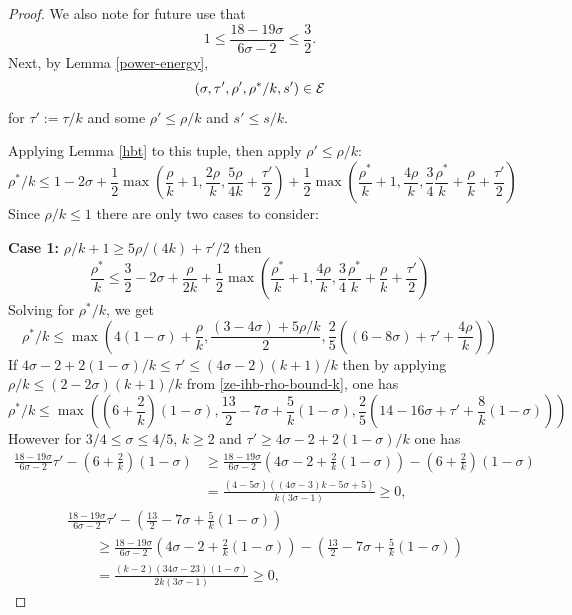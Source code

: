 \begin{proof}
We also note for future use that
\begin{equation}\label{ze-ihb-bound-tau-factor}
1 \le \frac{18 - 19\sigma}{6\sigma - 2} \le \frac{3}{2}.
\end{equation}
Next, by Lemma \ref{power-energy},
\[
(\sigma, \tau', \rho', \rho^*/k, s') \in \mathcal{E}
\]
for $\tau' := \tau/k$ and some $\rho' \le \rho/k$ and $s' \le s/k$.

Applying Lemma \ref{hbt} to this tuple, then apply $\rho' \le \rho/k$:
\[
\rho^*/k \leq 1-2\sigma + \frac{1}{2}\max(\frac{\rho}{k}+1, \frac{2\rho}{k}, \frac{5\rho}{4k} + \frac{\tau'}{2}) + \frac{1}{2}\max(\frac{\rho^*}{k}+1, \frac{4\rho}{k}, \frac{3}{4}\frac{\rho^*}{k} +\frac{\rho}{k}+\frac{\tau'}{2})
\]
Since $\rho/k \le 1$ there are only two cases to consider:

\textbf{Case 1:} $\rho/k + 1 \ge 5\rho/(4k) + \tau'/2$ then
\[
\frac{\rho^*}{k} \le \frac{3}{2} - 2\sigma + \frac{\rho}{2k} + \frac{1}{2}\max(\frac{\rho^*}{k}+1, \frac{4\rho}{k}, \frac{3}{4}\frac{\rho^*}{k} +\frac{\rho}{k}+\frac{\tau'}{2})
\]
Solving for $\rho^*/k$, we get
\[
\rho^*/k \le \max(4(1 - \sigma) + \frac{\rho}{k}, \frac{(3 - 4\sigma) + 5\rho/k}{2}, \frac{2}{5}((6 - 8\sigma) + \tau' + \frac{4\rho}{k}))
\]
If $4\sigma - 2 + 2(1 - \sigma)/k \le \tau' \le (4\sigma - 2)(k + 1)/k$ then by applying $\rho/k \le (2 - 2\sigma)(k + 1)/k$ from \eqref{ze-ihb-rho-bound-k}, one has
\[
\rho^*/k \le \max((6 + \frac{2}{k})(1 - \sigma), \frac{13}{2} - 7\sigma + \frac{5}{k} (1 - \sigma), \frac{2}{5}(14 - 16\sigma + \tau' + \frac{8}{k}(1 - \sigma)))
\]
However for $3/4 \le \sigma \le 4/5$, $k \ge 2$ and $\tau' \ge 4\sigma - 2 + 2(1 - \sigma)/k$ one has
\begin{align*}
\frac{18 - 19\sigma}{6\sigma - 2}\tau' - (6 + \frac{2}{k})(1 - \sigma) &\ge \frac{18 - 19\sigma}{6\sigma - 2}(4\sigma - 2 + \frac{2}{k}(1 - \sigma)) - (6 + \frac{2}{k})(1 - \sigma) \\
&= \frac{(4 - 5\sigma) ((4\sigma - 3)k - 5\sigma + 5)}{k(3\sigma - 1)} \ge 0,
\end{align*}
\begin{align*}
&\frac{18 - 19\sigma}{6\sigma - 2}\tau' - \left(\frac{13}{2} - 7\sigma + \frac{5}{k} (1 - \sigma)\right) \\
&\qquad\ge \frac{18 - 19\sigma}{6\sigma - 2}(4\sigma - 2 + \frac{2}{k}(1 - \sigma)) - \left(\frac{13}{2} - 7\sigma + \frac{5}{k} (1 - \sigma)\right) \\
&\qquad= \frac{(k - 2) (34\sigma - 23) (1 - \sigma)}{2 k (3\sigma - 1)} \ge 0,
\end{align*}

\end{proof}
